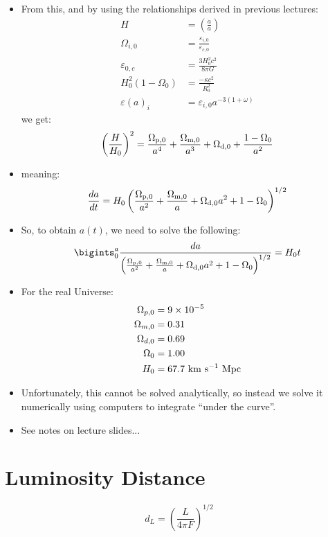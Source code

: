\documentclass[11pt]{article}
\begin{document}
\begin{itemize}
\item From this, and by using the relationships derived in previous lectures:
\begin{align}
    H &= \left(\frac{\dot{a}}{a}\right)\\
    \Omega_{i,0}&=\frac{\varepsilon{_{i,0}}}{\varepsilon{_{c,0}}}\\
    \varepsilon{_{0,c}}&=\frac{3H_0^2c^2}{8\pi G}\\
    H_0^2(1-\Omega_0)&= \frac{-\kappa c^2}{R_0^2}\\
    \varepsilon{(a)_i}&=\varepsilon{_{i,0}}a^{-3(1+\omega)}
\end{align}
we get:
\begin{equation}
\left(\frac{H}{H_0}\right)^2=\frac{\Omega_{\rm p, 0}}{a^4}+\frac{\Omega_{\rm m, 0}}{a^3} + \Omega_{\rm d, 0} + \frac{1-\Omega_0}{a^2}
\end{equation}
\item meaning:
\begin{equation}
    \frac{da}{dt}=H_0\left(\frac{\Omega_{\rm p, 0}}{a^2}+\frac{\Omega_{\rm m, 0}}{a} + \Omega_{\rm d, 0}a^2 + 1-\Omega_0\right)^{1/2}
\end{equation}
\item So, to obtain $a(t)$, we need to solve the following:
\begin{equation}
        \bigints_0^a{\frac{da}{\left(\frac{\Omega_{\rm p, 0}}{a^2}+\frac{\Omega_{\rm m, 0}}{a} + \Omega_{\rm d, 0}a^2 + 1-\Omega_0\right)^{1/2}}} = H_0t
\end{equation}
\item For the real Universe:
\begin{align}
\Omega_{p,0}&=9\times10^{-5}\\
\Omega_{m,0}&=0.31\\
\Omega_{d,0}&=0.69\\
\Omega_{0}&=1.00\\
H_0 &= 67.7~{\rm km~s^{-1}~Mpc}
\end{align}
\item Unfortunately, this cannot be solved analytically, so instead we solve it numerically using computers to integrate ``under the curve''.
\item See notes on lecture slides...
\end{itemize}

\section{Luminosity Distance}
\begin{equation}
    d_L = \left(\frac{L}{4\pi F}\right)^{1/2}
\end{equation}
\end{document}
